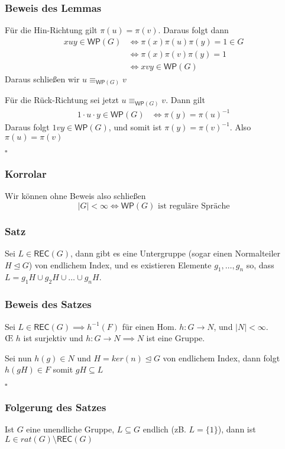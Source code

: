 \documentclass[12pt, german]{article}
\newcommand{\inv}{^{-1}}
\newcommand{\rec}{\mathsf{REC}}
\newcommand{\wop}{\mathsf{WP}}
\newcommand{\equivWP}{\equiv_{\mathsf{WP}(G)}}
\newcommand{\bewiesen}{
	
	\begin{flushright}
		$\square$  \\
\end{flushright}}
\begin{document}
	\subsubsection{Beweis des Lemmas}
	Für die Hin-Richtung gilt $\pi(u) = \pi(v)$. Daraus folgt dann
	\begin{align*}
		xuy \in \wop(G) &\iff \pi(x)\pi(u)\pi(y) = 1 \in G \\
		&\iff \pi(x)\pi(v)\pi(y) = 1 \\
		&\iff xvy \in \wop(G)
	\end{align*}
	Daraus schließen wir $u \equivWP v$
	\newline
	
	Für die Rück-Richtung sei jetzt $u \equivWP v$. Dann gilt 
	\begin{align*}
		1\cdot u \cdot y \in \wop(G) &\iff  \pi(y) = \pi(u)\inv
	\end{align*}
	Daraus folgt $1vy \in \wop(G)$, und somit ist $\pi(y) = \pi(v)\inv$. Also $\pi(u) = \pi(v)$
	\bewiesen
	
	\subsubsection{Korrolar}
	Wir können ohne Beweis also schließen $$|G| < \infty \iff \wop(G) \text{ ist reguläre Spräche}$$
	
	\subsubsection{Satz}
	Sei $L \in \rec(G)$, dann gibt es eine Untergruppe (sogar einen Normalteiler $H \trianglelefteq G$) von endlichem Index, und es existieren Elemente
	$g_1, \ldots, g_n$ so, dass $L = g_1H \cup g_2H \cup \ldots \cup g_nH$.   
	
	\subsubsection{Beweis des Satzes}
	Sei $L \in \rec(G) \implies h\inv(F)$ für einen Hom. $h:G \to N$, und $|N| < \infty$. \\
	
	\OE $\, \, h$ ist surjektiv und $h:G \to N \implies N$  ist eine Gruppe. 
	
	Sei nun $h(g) \in N$ und $H= ker(n) \trianglelefteq G$ von endlichem Index, dann folgt $h(gH) \in F$ somit $gH \subseteq L$
	\bewiesen
	
	\subsubsection{Folgerung des Satzes}	
	Ist $G$ eine unendliche Gruppe, $L \subseteq G$ endlich (zB. $L = \{1\}$), dann ist $L \in rat(G) \setminus \rec(G)$
	
\end{document}
